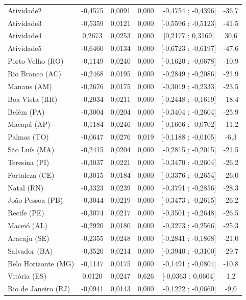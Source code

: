 \documentclass[12pt,a4paper,header]{abnt}
\begin{document}
\begin{center}
\begin{longtable}{lccccc}
Atividade2 & -0,4575 & 0,0091 & 0,000 & [-0,4754 ; -0,4396] & -36,7 \\
Atividade3 & -0,5359 & 0,0121 & 0,000 & [-0,5596 ; -0,5123] & -41,5 \\
Atividade4 & 0,2673 & 0,0253 & 0,000 & [0,2177 ; 0,3169] & 30,6 \\
Atividade5 & -0,6460 & 0,0134 & 0,000 & [-0,6723 ; -0,6197] & -47,6 \\
Porto Velho (RO) & -0,1149 & 0,0240 & 0,000 & [-0,1620 ; -0,0678] & -10,9 \\
Rio Branco (AC) & -0,2468 & 0,0195 & 0,000 & [-0,2849 ; -0,2086] & -21,9 \\
Manaus (AM) & -0,2676 & 0,0175 & 0,000 & [-0,3019 ; -0,2333] & -23,5 \\
Boa Vista (RR) & -0,2034 & 0,0211 & 0,000 & [-0,2448 ; -0,1619] & -18,4 \\
Belém (PA) & -0,3004 & 0,0204 & 0,000 & [-0,3404 ; -0,2604] & -25,9 \\
Macapá (AP) & -0,1184 & 0,0246 & 0,000 & [-0,1666 ; -0,0702] & -11,2 \\
Palmas (TO) & -0,0647 & 0,0276 & 0,019 & [-0,1188 ; -0,0105] & -6,3 \\
São Luís (MA) & -0,2415 & 0,0204 & 0,000 & [-0,2815 ; -0,2015] & -21,5 \\
Teresina (PI) & -0,3037 & 0,0221 & 0,000 & [-0,3470 ; -0,2604] & -26,2 \\
Fortaleza (CE) & -0,3015 & 0,0184 & 0,000 & [-0,3376 ; -0,2654] & -26,0 \\
Natal (RN) & -0,3323 & 0,0239 & 0,000 & [-0,3791 ; -0,2856] & -28,3 \\
João Pessoa (PB) & -0,3044 & 0,0219 & 0,000 & [-0,3473 ; -0,2615] & -26,2 \\
Recife (PE) & -0,3074 & 0,0217 & 0,000 & [-0,3501 ; -0,2648] & -26,5 \\
Maceió (AL) & -0,2920 & 0,0180 & 0,000 & [-0,3273 ; -0,2566] & -25,3 \\
Aracaju (SE) & -0,2355 & 0,0248 & 0,000 & [-0,2841 ; -0,1868] & -21,0 \\
Salvador (BA) & -0,3520 & 0,0214 & 0,000 & [-0,3940 ; -0,3100] & -29,7 \\
Belo Horizonte (MG) & -0,1147 & 0,0175 & 0,000 & [-0,1491 ; -0,0804] & -10,8 \\
Vitória (ES) & 0,0120 & 0,0247 & 0,626 & [-0,0363 ; 0,0604] & 1,2 \\
Rio de Janeiro (RJ) & -0,0941 & 0,0143 & 0,000 & [-0,1222 ; -0,0660] & -9,0 \\

\end{longtable}
\end{center}
\end{document}
